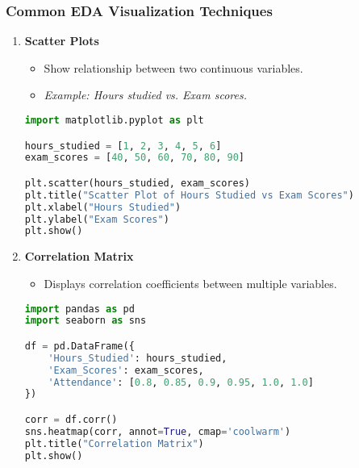 \documentclass{beamer}
\begin{document}
\begin{frame}[fragile]
    \frametitle{Common EDA Visualization Techniques}
    \begin{enumerate}
        \item \textbf{Scatter Plots}
            \begin{itemize}
                \item Show relationship between two continuous variables.
                \item \textit{Example: Hours studied vs. Exam scores.}
            \end{itemize}
            \begin{lstlisting}[language=Python]
import matplotlib.pyplot as plt

hours_studied = [1, 2, 3, 4, 5, 6]
exam_scores = [40, 50, 60, 70, 80, 90]

plt.scatter(hours_studied, exam_scores)
plt.title("Scatter Plot of Hours Studied vs Exam Scores")
plt.xlabel("Hours Studied")
plt.ylabel("Exam Scores")
plt.show()
            \end{lstlisting}
            
        \item \textbf{Correlation Matrix}
            \begin{itemize}
                \item Displays correlation coefficients between multiple variables.
            \end{itemize}
            \begin{lstlisting}[language=Python]
import pandas as pd
import seaborn as sns

df = pd.DataFrame({
    'Hours_Studied': hours_studied,
    'Exam_Scores': exam_scores,
    'Attendance': [0.8, 0.85, 0.9, 0.95, 1.0, 1.0]
})

corr = df.corr()
sns.heatmap(corr, annot=True, cmap='coolwarm')
plt.title("Correlation Matrix")
plt.show()
            \end{lstlisting}
    \end{enumerate}
\end{frame}
\end{document}
